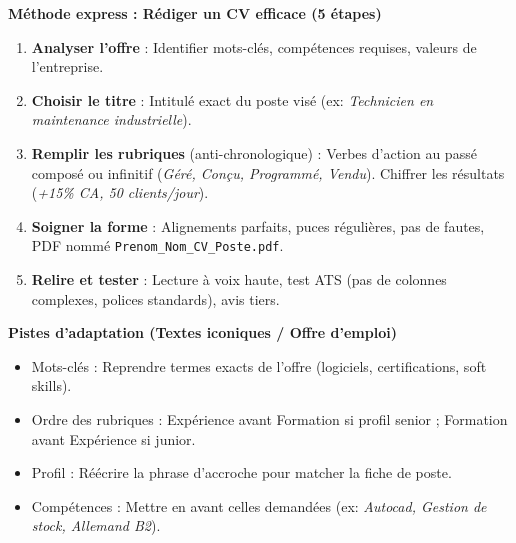 \documentclass[11pt]{article}
\newcommand{\cle}[1]{{\popxbold\color{popdark}#1}}
\begin{document}
\begin{bilan}
\textbf{Méthode express : Rédiger un CV efficace (5 étapes)}
\begin{enumerate}
  \item \textbf{Analyser l'offre} : Identifier mots-clés, compétences requises, valeurs de l'entreprise.
  \item \textbf{Choisir le titre} : Intitulé exact du poste visé (ex: \emph{Technicien en maintenance industrielle}).
  \item \textbf{Remplir les rubriques} (anti-chronologique) : Verbes d'action au passé composé ou infinitif (\emph{Géré, Conçu, Programmé, Vendu}). Chiffrer les résultats (\emph{+15\% CA, 50 clients/jour}).
  \item \textbf{Soigner la forme} : Alignements parfaits, puces régulières, pas de fautes, PDF nommé \texttt{Prenom\_Nom\_CV\_Poste.pdf}.
  \item \textbf{Relire et tester} : Lecture à voix haute, test ATS (pas de colonnes complexes, polices standards), avis tiers.
\end{enumerate}

\textbf{Pistes d'adaptation (Textes iconiques / Offre d'emploi)}
\begin{itemize}
  \item \cle{Mots-clés} : Reprendre termes exacts de l'offre (logiciels, certifications, soft skills).
  \item \cle{Ordre des rubriques} : Expérience avant Formation si profil senior ; Formation avant Expérience si junior.
  \item \cle{Profil} : Réécrire la phrase d'accroche pour matcher la fiche de poste.
  \item \cle{Compétences} : Mettre en avant celles demandées (ex: \emph{Autocad, Gestion de stock, Allemand B2}).
\end{itemize}

\end{bilan}
\end{document}
